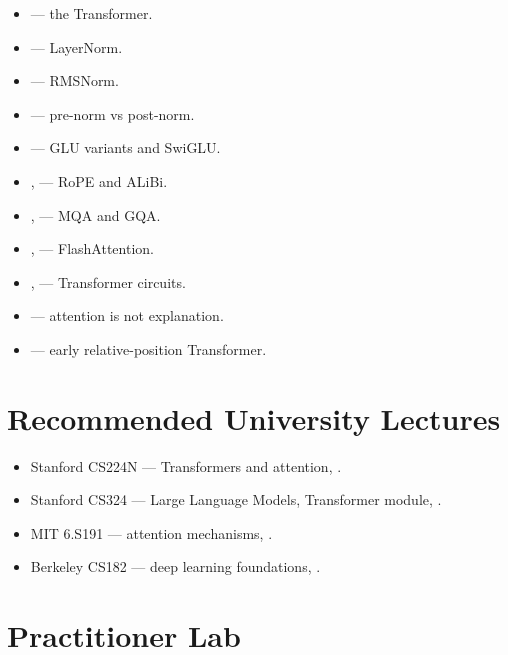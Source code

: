 \begin{itemize}
  \item \citet{vaswani2017attention} --- the Transformer.
  \item \citet{ba2016layernorm} --- LayerNorm.
  \item \citet{zhang2019rmsnorm} --- RMSNorm.
  \item \citet{xiong2020onlayer} --- pre-norm vs post-norm.
  \item \citet{shazeer2020glu} --- GLU variants and SwiGLU.
  \item \citet{su2021rope}, \citet{press2022alibi} --- RoPE and ALiBi.
  \item \citet{shazeer2019fast}, \citet{ainslie2023gqa} --- MQA and
        GQA.
  \item \citet{dao2022flashattention}, \citet{dao2023flashattention2}
        --- FlashAttention.
  \item \citet{elhage2021mathematical},
        \citet{olsson2022induction} --- Transformer circuits.
  \item \citet{jain2019attention} --- attention is not explanation.
  \item \citet{shaw2018relative} --- early relative-position
        Transformer.
\end{itemize}

\section{Recommended University Lectures}

\begin{itemize}
  \item Stanford CS224N --- Transformers and attention,
        \citet{stanford_cs224n}.
  \item Stanford CS324 --- Large Language Models, Transformer module,
        \citet{stanford_cs324}.
  \item MIT 6.S191 --- attention mechanisms, \citet{mit_6s191}.
  \item Berkeley CS182 --- deep learning foundations,
        \citet{berkeley_cs182}.
\end{itemize}

\section{Practitioner Lab}

